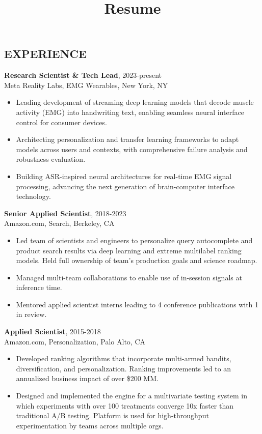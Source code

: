 \documentclass[line,10pt]{res}
\title{Resume}
\begin{document}
 
\thispagestyle{empty} %
\address{716.771.8224}
\address{daniel.n.hill@gmail.com}

\begin{resume}

\section{EXPERIENCE}
\vspace{5pt}

{\bf Research Scientist \& Tech Lead}, 2023-present \\ Meta Reality Labs, EMG Wearables, New York, NY 
  \begin{itemize}
          \item[] Leading development of streaming deep learning models that decode muscle activity (EMG) into handwriting text, enabling seamless neural interface control for consumer devices.
          \item[] Architecting personalization and transfer learning frameworks to adapt models across users and contexts, with comprehensive failure analysis and robustness evaluation.
          \item[] Building ASR-inspired neural architectures for real-time EMG signal processing, advancing the next generation of brain-computer interface technology.
   \end{itemize}

{\bf Senior Applied Scientist}, 2018-2023 \\ Amazon.com, Search, Berkeley, CA 
  \begin{itemize}
          \item[] Led team of scientists and engineers to personalize query autocomplete and product search results via deep learning and extreme multilabel ranking models. Held full ownership of team's production goals and science roadmap.
          \item[] Managed multi-team collaborations to enable use of in-session signals at inference time.
          \item[] Mentored applied scientist interns leading to 4 conference publications with 1 in review.
   \end{itemize}
 {\bf Applied Scientist}, 2015-2018 \\ Amazon.com, Personalization, Palo Alto, CA 
  \begin{itemize}
          \item[] Developed ranking algorithms that incorporate multi-armed bandits, diversification, and personalization. Ranking improvements led to an annualized business impact of over \$200 MM.
          \item[] Designed and implemented the engine for a multivariate testing system in which experiments with over 100 treatments converge 10x faster than traditional A/B testing. Platform is used for high-throughput experimentation by teams across multiple orgs.
   \end{itemize}
   

\end{resume}
\end{document}
